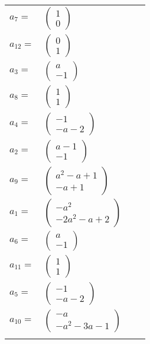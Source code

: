 \documentclass[1p]{elsarticle_modified}
\theoremstyle{definition}
\begin{document}
\begin{tabular}{m{7pt} m{180pt} m{7pt} m{180pt} }
\flushright $a_{7}=$&$\begin{pmatrix}1\\0\end{pmatrix}$ \\
\flushright $a_{12}=$&$\begin{pmatrix}0\\1\end{pmatrix}$ \\
\flushright $a_{3}=$&$\begin{pmatrix}a\\-1\end{pmatrix}$ \\
\flushright $a_{8}=$&$\begin{pmatrix}1\\1\end{pmatrix}$ \\
\flushright $a_{4}=$&$\begin{pmatrix}-1\\- a-2\end{pmatrix}$ \\
\flushright $a_{2}=$&$\begin{pmatrix}a-1\\-1\end{pmatrix}$ \\
\flushright $a_{9}=$&$\begin{pmatrix}a^2- a+1\\- a+1\end{pmatrix}$ \\
\flushright $a_{1}=$&$\begin{pmatrix}- a^2\\-2 a^2- a+2\end{pmatrix}$ \\
\flushright $a_{6}=$&$\begin{pmatrix}a\\-1\end{pmatrix}$ \\
\flushright $a_{11}=$&$\begin{pmatrix}1\\1\end{pmatrix}$ \\
\flushright $a_{5}=$&$\begin{pmatrix}-1\\- a-2\end{pmatrix}$ \\
\flushright $a_{10}=$&$\begin{pmatrix}- a\\- a^2-3 a-1\end{pmatrix}$\\&\end{tabular}
\end{document}
